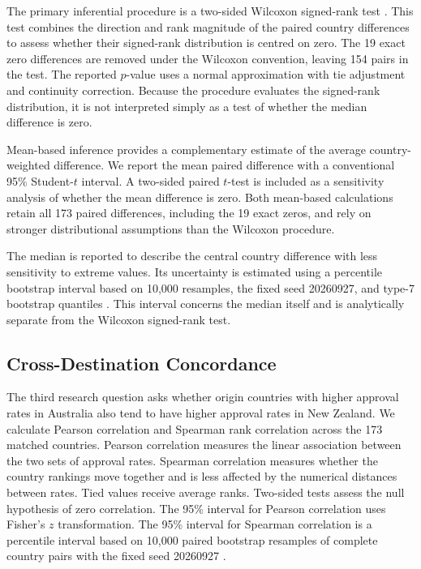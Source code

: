 \documentclass[runningheads]{llncs}
\begin{document}
The primary inferential procedure is a two-sided Wilcoxon signed-rank test \cite{Wilcoxon1945}. This test combines the direction and rank magnitude of the paired country differences to assess whether their signed-rank distribution is centred on zero. The 19 exact zero differences are removed under the Wilcoxon convention, leaving 154 pairs in the test. The reported $p$-value uses a normal approximation with tie adjustment and continuity correction. Because the procedure evaluates the signed-rank distribution, it is not interpreted simply as a test of whether the median difference is zero.

Mean-based inference provides a complementary estimate of the average country-weighted difference. We report the mean paired difference with a conventional 95\% Student-$t$ interval. A two-sided paired $t$-test is included as a sensitivity analysis of whether the mean difference is zero. Both mean-based calculations retain all 173 paired differences, including the 19 exact zeros, and rely on stronger distributional assumptions than the Wilcoxon procedure.

The median is reported to describe the central country difference with less sensitivity to extreme values. Its uncertainty is estimated using a percentile bootstrap interval based on 10,000 resamples, the fixed seed 20260927, and type-7 bootstrap quantiles \cite{Efron1979,Efron1987,HyndmanFan1996}. This interval concerns the median itself and is analytically separate from the Wilcoxon signed-rank test.

\subsection{Cross-Destination Concordance}

The third research question asks whether origin countries with higher approval rates in Australia also tend to have higher approval rates in New Zealand. We calculate Pearson correlation and Spearman rank correlation across the 173 matched countries. Pearson correlation measures the linear association between the two sets of approval rates. Spearman correlation measures whether the country rankings move together and is less affected by the numerical distances between rates. Tied values receive average ranks. Two-sided tests assess the null hypothesis of zero correlation. The 95\% interval for Pearson correlation uses Fisher's $z$ transformation. The 95\% interval for Spearman correlation is a percentile interval based on 10,000 paired bootstrap resamples of complete country pairs with the fixed seed 20260927 \cite{Efron1979,Efron1987}.
\end{document}
